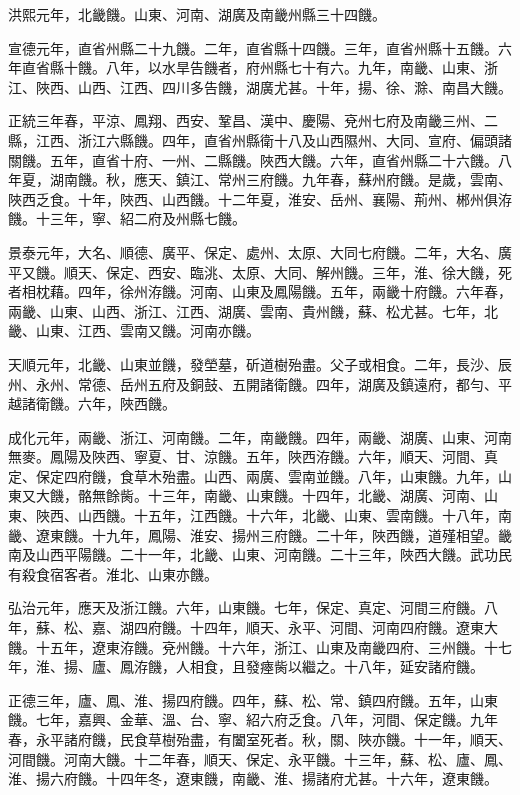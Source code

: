 \begin{pinyinscope}
洪熙元年，北畿饑。山東、河南、湖廣及南畿州縣三十四饑。

宣德元年，直省州縣二十九饑。二年，直省縣十四饑。三年，直省州縣十五饑。六年直省縣十饑。八年，以水旱告饑者，府州縣七十有六。九年，南畿、山東、浙江、陜西、山西、江西、四川多告饑，湖廣尤甚。十年，揚、徐、滁、南昌大饑。

正統三年春，平涼、鳳翔、西安、鞏昌、漢中、慶陽、兗州七府及南畿三州、二縣，江西、浙江六縣饑。四年，直省州縣衛十八及山西隰州、大同、宣府、偏頭諸關饑。五年，直省十府、一州、二縣饑。陜西大饑。六年，直省州縣二十六饑。八年夏，湖南饑。秋，應天、鎮江、常州三府饑。九年春，蘇州府饑。是歲，雲南、陜西乏食。十年，陜西、山西饑。十二年夏，淮安、岳州、襄陽、荊州、郴州俱洊饑。十三年，寧、紹二府及州縣七饑。

景泰元年，大名、順德、廣平、保定、處州、太原、大同七府饑。二年，大名、廣平又饑。順天、保定、西安、臨洮、太原、大同、解州饑。三年，淮、徐大饑，死者相枕藉。四年，徐州洊饑。河南、山東及鳳陽饑。五年，兩畿十府饑。六年春，兩畿、山東、山西、浙江、江西、湖廣、雲南、貴州饑，蘇、松尤甚。七年，北畿、山東、江西、雲南又饑。河南亦饑。

天順元年，北畿、山東並饑，發塋墓，斫道樹殆盡。父子或相食。二年，長沙、辰州、永州、常德、岳州五府及銅鼓、五開諸衛饑。四年，湖廣及鎮遠府，都勻、平越諸衛饑。六年，陜西饑。

成化元年，兩畿、浙江、河南饑。二年，南畿饑。四年，兩畿、湖廣、山東、河南無麥。鳳陽及陜西、寧夏、甘、涼饑。五年，陜西洊饑。六年，順天、河間、真定、保定四府饑，食草木殆盡。山西、兩廣、雲南並饑。八年，山東饑。九年，山東又大饑，骼無餘胔。十三年，南畿、山東饑。十四年，北畿、湖廣、河南、山東、陜西、山西饑。十五年，江西饑。十六年，北畿、山東、雲南饑。十八年，南畿、遼東饑。十九年，鳳陽、淮安、揚州三府饑。二十年，陜西饑，道殣相望。畿南及山西平陽饑。二十一年，北畿、山東、河南饑。二十三年，陜西大饑。武功民有殺食宿客者。淮北、山東亦饑。

弘治元年，應天及浙江饑。六年，山東饑。七年，保定、真定、河間三府饑。八年，蘇、松、嘉、湖四府饑。十四年，順天、永平、河間、河南四府饑。遼東大饑。十五年，遼東洊饑。兗州饑。十六年，浙江、山東及南畿四府、三州饑。十七年，淮、揚、廬、鳳洊饑，人相食，且發瘞胔以繼之。十八年，延安諸府饑。

正德三年，廬、鳳、淮、揚四府饑。四年，蘇、松、常、鎮四府饑。五年，山東饑。七年，嘉興、金華、溫、台、寧、紹六府乏食。八年，河間、保定饑。九年春，永平諸府饑，民食草樹殆盡，有闔室死者。秋，關、陜亦饑。十一年，順天、河間饑。河南大饑。十二年春，順天、保定、永平饑。十三年，蘇、松、廬、鳳、淮、揚六府饑。十四年冬，遼東饑，南畿、淮、揚諸府尤甚。十六年，遼東饑。


\end{pinyinscope}
